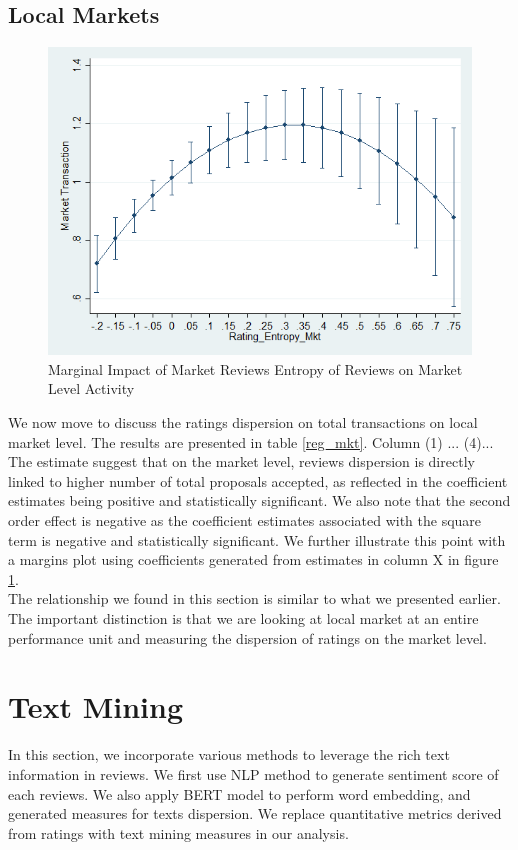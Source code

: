 \documentclass[msom,blindrev]{informs3}
\begin{document}
\subsection{Local Markets}

\begin{figure}
	\centering
	\includegraphics[width=0.7\linewidth]{marginsplot_entmkt.png}
	\caption{Marginal Impact of Market Reviews Entropy of Reviews on Market Level Activity}
	\label{marginsplot_mkt_entmkt}
\end{figure}

We now move to discuss the ratings dispersion on total transactions on local market level. The results are presented in table \ref{reg_mkt}. Column (1) ... (4)... The estimate suggest that on the market level, reviews dispersion is directly linked to higher number of total proposals accepted, as reflected in the coefficient estimates being positive and statistically significant. We also note that the second order effect is negative as the coefficient estimates associated with the square term is negative and statistically significant. We further illustrate this point with a margins plot using coefficients generated from estimates in column X in figure \ref{marginsplot_mkt_entmkt}. \\
The relationship we found in this section is similar to what we presented earlier. The important distinction is that we are looking at local market at an entire performance unit and measuring the dispersion of ratings on the market level.
\section{Text Mining}
In this section, we incorporate various methods to leverage the rich text information in reviews.  We first use NLP method to generate sentiment score of each reviews. We also apply BERT model to perform word embedding, and generated measures for texts dispersion. We replace quantitative metrics derived from ratings with text mining measures in our analysis. 
\end{document}
